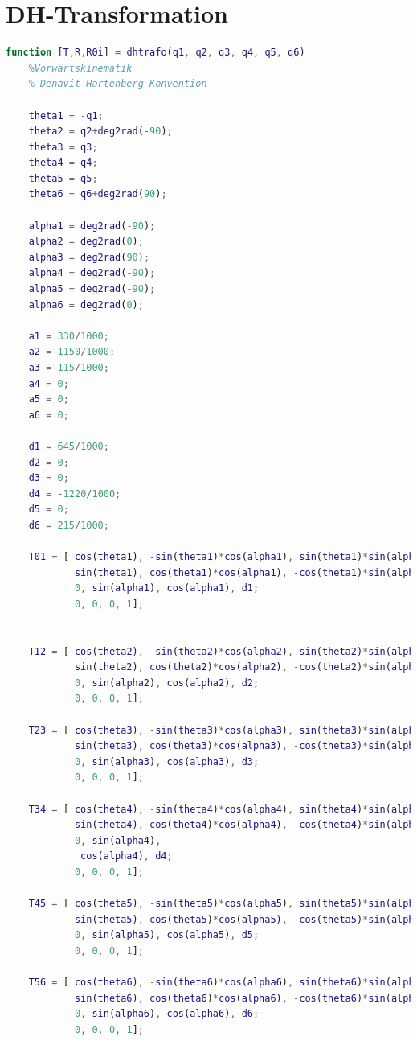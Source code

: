 \section{DH-Transformation}
\label{add:dh}
%
\begin{lstlisting}[language=Matlab, numbers=none]
	function [T,R,R0i] = dhtrafo(q1, q2, q3, q4, q5, q6)
	%Vorwärtskinematik
	% Denavit-Hartenberg-Konvention
	
	theta1 = -q1;
	theta2 = q2+deg2rad(-90);
	theta3 = q3;
	theta4 = q4;
	theta5 = q5;
	theta6 = q6+deg2rad(90);
	
	alpha1 = deg2rad(-90);
	alpha2 = deg2rad(0);
	alpha3 = deg2rad(90);
	alpha4 = deg2rad(-90);
	alpha5 = deg2rad(-90);
	alpha6 = deg2rad(0);
	
	a1 = 330/1000;
	a2 = 1150/1000;
	a3 = 115/1000;
	a4 = 0;
	a5 = 0;
	a6 = 0;
	
	d1 = 645/1000;
	d2 = 0;
	d3 = 0;
	d4 = -1220/1000;
	d5 = 0;
	d6 = 215/1000;
	
	T01 = [ cos(theta1), -sin(theta1)*cos(alpha1), sin(theta1)*sin(alpha1), a1*cos(theta1);
			sin(theta1), cos(theta1)*cos(alpha1), -cos(theta1)*sin(alpha1), a1*sin(theta1);
			0, sin(alpha1), cos(alpha1), d1;
			0, 0, 0, 1];
	
	
	T12 = [ cos(theta2), -sin(theta2)*cos(alpha2), sin(theta2)*sin(alpha2), a2*cos(theta2);
			sin(theta2), cos(theta2)*cos(alpha2), -cos(theta2)*sin(alpha2), a2*sin(theta2);
			0, sin(alpha2), cos(alpha2), d2;
			0, 0, 0, 1];
	
	T23 = [ cos(theta3), -sin(theta3)*cos(alpha3), sin(theta3)*sin(alpha3), a3*cos(theta3);
			sin(theta3), cos(theta3)*cos(alpha3), -cos(theta3)*sin(alpha3), a3*sin(theta3);
			0, sin(alpha3), cos(alpha3), d3;
			0, 0, 0, 1];
	
	T34 = [ cos(theta4), -sin(theta4)*cos(alpha4), sin(theta4)*sin(alpha4), a4*cos(theta4);
			sin(theta4), cos(theta4)*cos(alpha4), -cos(theta4)*sin(alpha4), a4*sin(theta4);
			0, sin(alpha4), 
			 cos(alpha4), d4;
			0, 0, 0, 1];
	
	T45 = [ cos(theta5), -sin(theta5)*cos(alpha5), sin(theta5)*sin(alpha5), a5*cos(theta5);
			sin(theta5), cos(theta5)*cos(alpha5), -cos(theta5)*sin(alpha5), a5*sin(theta5);
			0, sin(alpha5), cos(alpha5), d5;
			0, 0, 0, 1];
	
	T56 = [ cos(theta6), -sin(theta6)*cos(alpha6), sin(theta6)*sin(alpha6), a6*cos(theta6);
			sin(theta6), cos(theta6)*cos(alpha6), -cos(theta6)*sin(alpha6), a6*sin(theta6);
			0, sin(alpha6), cos(alpha6), d6;
			0, 0, 0, 1];
	

\end{lstlisting}
